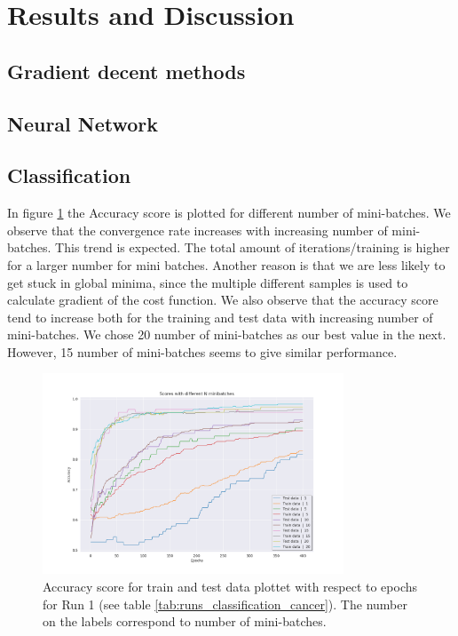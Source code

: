 \section{Results and Discussion}


\subsection{Gradient decent methods}

\subsection{Neural Network}

\subsection{Classification}


%                              


In figure \ref{fig:d_line_batch_size} the Accuracy score is plotted for
different number of mini-batches. We observe that the convergence rate
increases with increasing number of mini-batches. This trend is expected. The
total amount of iterations/training is higher for a larger number for
mini batches. Another reason is that we are less likely to get stuck in global
minima, since the multiple different samples is used to calculate gradient of the
cost function. We also observe that the accuracy score tend to increase both
for the training and test data with increasing number of mini-batches.
We chose 20 number of mini-batches as our best value in the next. However, 15
number of mini-batches seems to give similar performance.    


\begin{figure}[H]
    \centering
    \includegraphics[width=0.8\textwidth]{Figures/PartD/d_line_batch_size.png}
    \caption{Accuracy score for train and test data plottet with respect to epochs for Run 1 (see table
    \ref{tab:runs_classification_cancer}). The number on the labels correspond
to number of mini-batches.}  
    \label{fig:d_line_batch_size} 
\end{figure}



